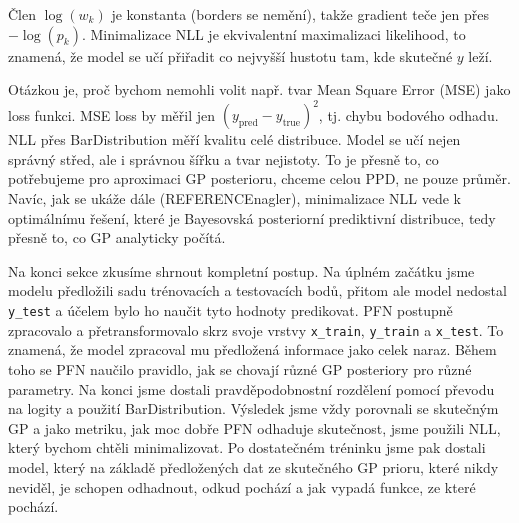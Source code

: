 Člen $\log(w_k)$ je konstanta (borders se nemění), takže gradient teče jen přes $-\log(p_k)$. 
Minimalizace NLL je ekvivalentní maximalizaci likelihood, to znamená, že model se učí přiřadit co nejvyšší hustotu tam, kde skutečné $y$ leží.

Otázkou je, proč bychom nemohli volit např. tvar Mean Square Error (MSE) jako loss funkci.
MSE loss by měřil jen $(y_{\text{pred}} - y_{\text{true}})^2$, tj. chybu bodového odhadu. 
NLL přes BarDistribution měří kvalitu celé distribuce.
Model se učí nejen správný střed, ale i správnou šířku a tvar nejistoty. 
To je přesně to, co potřebujeme pro aproximaci GP posterioru, chceme celou PPD, ne pouze průměr.
Navíc, jak se ukáže dále (REFERENCEnagler), minimalizace NLL vede k optimálnímu řešení, které je Bayesovská posteriorní prediktivní distribuce, tedy přesně to, co GP analyticky počítá.
\par    

Na konci sekce zkusíme shrnout kompletní postup.
Na úplném začátku jsme modelu předložili sadu trénovacích a testovacích bodů, přitom ale model nedostal \texttt{y\_test} a účelem bylo ho naučit tyto hodnoty predikovat.
PFN postupně zpracovalo a přetransformovalo skrz svoje vrstvy \texttt{x\_train}, \texttt{y\_train} a \texttt{x\_test}.
To znamená, že model zpracoval mu předložená informace jako celek naraz.
Během toho se PFN naučilo pravidlo, jak se chovají různé GP posteriory pro různé parametry.
Na konci jsme dostali pravděpodobnostní rozdělení pomocí převodu na logity a použití BarDistribution.
Výsledek jsme vždy porovnali se skutečným GP a jako metriku, jak moc dobře PFN odhaduje skutečnost, jsme použili NLL, který bychom chtěli minimalizovat.
Po dostatečném tréninku jsme pak dostali model, který na základě předložených dat ze skutečného GP prioru, které nikdy neviděl, je schopen odhadnout, odkud pochází a jak vypadá funkce, ze které pochází.


